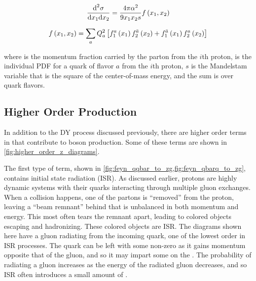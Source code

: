 \begin{equation}\label{eq:drell_yan_cross_section}
    \frac{\text{d}^{2}\sigma}
    {\text{d}x_{1} \text{d}x_{2}}
    =
    \frac{4 \pi \alpha^{2}}
    {9 x_{1} x_{2} s}
    f \left( x_{1}, x_{2} \right)
\end{equation}

\begin{equation}\label{eq:fx}
    f \left( x_{1}, x_{2} \right)
    =
    \sum_{a}
    Q^{2}_{a}
    \left[
        f^{a}_{1} \left( x_{1} \right)
        f^{\bar{a}}_{2} \left( x_{2} \right)
        +
        f^{\bar{a}}_{1} \left( x_{1} \right)
        f^{a}_{2} \left( x_{2} \right)
    \right]
\end{equation}

where  is the momentum fraction carried by the parton from the
$i$th proton,  is the individual PDF for a quark of
flavor $a$ from the $i$th proton, $s$ is the Mandelstam variable that is the
square of the center-of-mass energy, and the sum is over quark flavors.



\subsection{Higher Order Production}
\label{ssec:higher_order}

In addition to the DY process discussed previously, there are higher order
terms in \alphastrong that contribute to \Z boson production. Some of these
terms are shown in \cref{fig:higher_order_z_diagrams}.

The first type of term, shown in
\cref{fig:feyn_qqbar_to_zg,fig:feyn_qbarq_to_zg}, contains initial state
radiation (ISR). As discussed earlier, protons are highly dynamic systems with
their quarks interacting through multiple gluon exchanges. When a collision
happens, one of the partons is ``removed'' from the proton, leaving a ``beam
remnant'' behind that is unbalanced in both momentum and energy. This most
often tears the remnant apart, leading to colored objects escaping and
hadronizing. These colored objects are ISR. The diagrams shown here have a
gluon radiating from the incoming quark, one of the lowest order in
\alphastrong ISR processes. The quark can be left with some non-zero \pt as it
gains momentum opposite that of the gluon, and so it may impart some \bosonpt
on the \Z. The probability of radiating a gluon increases as the energy of the
radiated gluon decreases, and so ISR often introduces a small amount of
\bosonpt.


